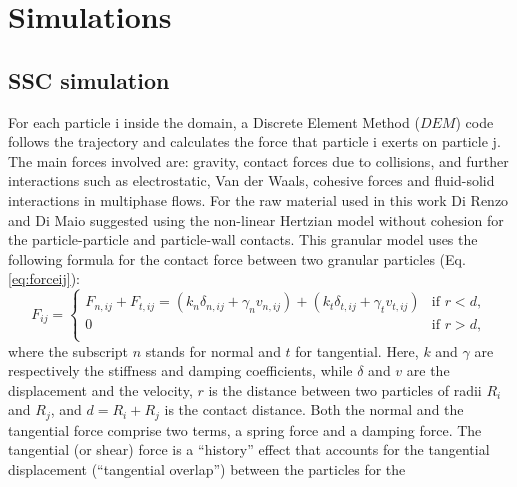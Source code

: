 \documentclass[review]{elsarticle}
\begin{document}
\newpage
\begin{appendix}
\label{appendix}

\section{Simulations}
\label{sec:appsimulations}

\subsection{SSC simulation}
\label{subsec:srsctsimulation}
For each particle i inside the domain, a Discrete Element Method ($DEM$) code
follows the trajectory and calculates the force that particle i exerts on particle j.
The main forces involved are: gravity, contact forces due to collisions, and
further interactions such as electrostatic, Van der Waals, cohesive forces and fluid-solid interactions in multiphase flows. For the raw material used in this work 
Di Renzo and Di Maio \cite{RefWorks:145} suggested using the non-linear
Hertzian model without cohesion for the particle-particle and particle-wall contacts. 
This granular model uses the following formula for the contact force between two granular particles (Eq. \ref{eq:forceij}):
\begin{equation}
 F_{ij} = 
\begin{cases}
F_{n,ij} + F_{t,ij} = \left( k_n \delta_{n,ij} + \gamma_n v_{n,ij} \right) + \left( k_t \delta_{t,ij} + \gamma_t v_{t,ij} \right) & \text{if } r < d ,\\
0    & \text{if } r > d ,\\
\end{cases}
 \label{eq:forceij}
\end{equation}
where the subscript $n$ stands for normal and $t$ for tangential. 
Here, $k$ and $\gamma$ are respectively the stiffness and damping coefficients, 
while $\delta$ and $v$ are the displacement and the velocity, $r$ is the
distance between two particles of radii $R_i$ and $R_j$, and $d = R_i + R_j $ is
the contact distance.
Both the normal and the tangential
force comprise two terms, a spring force and a damping force. 
The tangential (or shear) force is a ``history'' effect that accounts for the
tangential displacement (``tangential overlap'') between the particles for the

\end{appendix}
\end{document}
